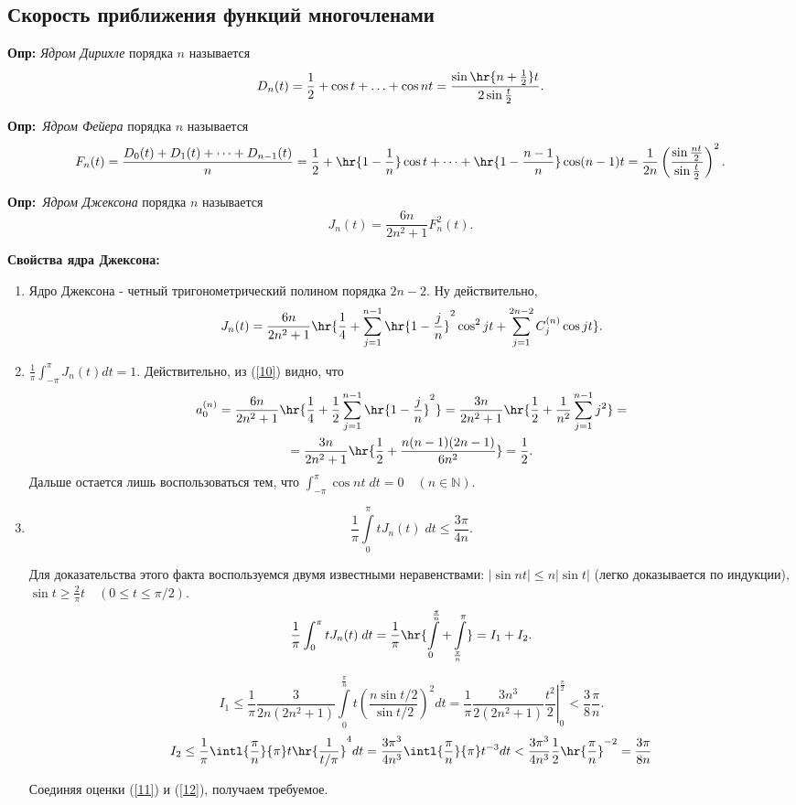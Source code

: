 \documentclass[a4paper]{article}
\def\defin{\noindent\textbf{Опр:}\ }
\begin{document}
\subsection{Скорость приближения функций многочленами}
\textbf{Опр:} \emph{Ядром Дирихле} порядка $n$ называется
$$D_n(t)=\frac12+\cos t+\ldots+\cos nt=\frac{\sin\hr{n+\frac12}t}{2\sin \frac t2}.$$

\defin \emph{Ядром Фейера} порядка $n$ называется
\begin{multline*}
F_n(t)=\frac{D_0(t)+D_1(t)+\dots+D_{n-1}(t)}{n}=\frac12+\hr{1-\frac1n}\cos
t+\dots+\hr{1-\frac{n-1}{n}}\cos
(n-1)t=\frac1{2n}\left(\frac{\sin \frac{nt}2}{\sin\frac t2}\right)^2.
\end{multline*}

\defin \emph{Ядром Джексона} порядка $n$
называется
$$J_n(t)=\frac{6n}{2n^2+1}F_n^2(t).$$

\noindent\textbf{Свойства ядра Джексона:}
\begin{enumerate}
\item
Ядро Джексона - четный тригонометрический полином порядка $2n-2.$
Ну действительно,
\begin{equation}\label{10}
J_n(t)=\frac{6n}{2n^2+1}\hr{\frac14+\sum_{j=1}^{n-1}
\hr{1-\frac jn}^2\cos^2 jt+\sum_{j=1}^{2n-2}C_j^{(n)}\cos
jt}.
\end{equation}
\item
$\frac1{\pi}\int_{-\pi}^{\pi}J_n(t)dt=1.$ Действительно, из
(\ref{10}) видно, что
\begin{multline*}
a_0^{(n)}=\frac{6n}{2n^2+1}\hr{\frac14+\frac12\sum_{j=1}^{n-1}
\hr{1-\frac jn}^2}=\frac{3n}{2n^2+1}\hr{\frac12+\frac1{n^2}\sum_{j=1}^{n-1}j^2}=\\
=\frac{3n}{2n^2+1}\hr{\frac12+\frac{n(n-1)(2n-1)}{6n^2}}=\frac12.
\end{multline*}
Дальше остается лишь воспользоваться тем, что
$\int_{-\pi}^{\pi}\cos nt \;dt=0\quad(n\in\mathbb{N}).$
\item
$$\frac1{\pi}\int\limits_0^{\pi} tJ_n(t)\;dt\le\frac{3\pi}{4n}.$$

Для доказательства этого факта воспользуемся двумя известными
неравенствами: $|\sin nt|\le n|\sin t|$ (легко доказывается по
индукции), $\sin t\ge \frac2{\pi}t\quad (0\le t\le\pi/2).$
$$\frac1{\pi}\int_0^{\pi}
tJ_n(t)\;dt=\frac1{\pi}\hr{\int\limits_0^{\frac{\pi}{n}}+\int\limits_{\frac{\pi}{n}}^{\pi}}=I_1+I_2.$$

\begin{equation}\label{11}
I_1\le\frac1{\pi}\frac{3}{2n(2n^2+1)}\int\limits_0^{\frac{\pi}{n}}
t\left(\frac{n\sin t/2}{\sin t/2}\right)^2dt=
\left.\frac1{\pi}\frac{3n^3}{2(2n^2+1)}\frac{t^2}2\right|_0^{\frac{\pi}2}<\frac38\frac{\pi}n.
\end{equation}
\begin{equation}\label{12}
I_2\le\frac1{\pi}\intl{\frac{\pi}{n}}{\pi}
t\hr{\frac1{t/\pi}}^4dt=\frac{3\pi^3}{4n^3}\intl{\frac{\pi}{n}}{\pi}t^{-3}dt<\frac{3\pi^3}{4n^3}\frac12\hr{\frac{\pi}n}^{-2}=\frac{3\pi}{8n}
\end{equation}

Соединяя оценки (\ref{11}) и (\ref{12}), получаем требуемое.
\end{enumerate}
\end{document}
